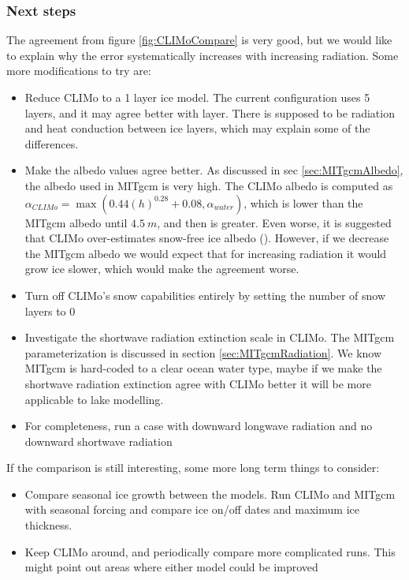 \documentclass[11pt]{article}
\begin{document}
\subsubsection{Next steps}
The agreement from figure \ref{fig:CLIMoCompare} is very good, but we would like to explain why the error systematically increases with increasing radiation. Some more modifications to try are:
\begin{itemize}
\item{Reduce CLIMo to a 1 layer ice model. The current configuration uses 5 layers, and it may agree better with  layer. There is supposed to be radiation and heat conduction between ice layers, which may explain some of the differences.}
\item{Make the albedo values agree better. As discussed in sec \ref{sec:MITgcmAlbedo}, the albedo used in MITgcm is very high. The CLIMo albedo is computed as $\alpha_{CLIMo} = \max(0.44 \left(h\right)^{0.28} + 0.08, \alpha_{water})$, which is lower than the MITgcm albedo until $\SI{4.5}{m}$, and then is greater. Even worse, it is suggested that CLIMo over-estimates snow-free ice albedo (\cite{Svacina2014}). However, if we decrease the MITgcm albedo we would expect that for increasing radiation it would grow ice slower, which would make the agreement worse.}
\item{Turn off CLIMo's snow capabilities entirely by setting the number of snow layers to 0}
\item{Investigate the shortwave radiation extinction scale in CLIMo. The MITgcm parameterization is discussed in section \ref{sec:MITgcmRadiation}. We know MITgcm is hard-coded to a clear ocean water type, maybe if we make the shortwave radiation extinction agree with CLIMo better it will be more applicable to lake modelling.}
\item{For completeness, run a case with downward longwave radiation and no downward shortwave radiation}
\end{itemize}
If the comparison is still interesting, some more long term things to consider:
\begin{itemize}
\item{Compare seasonal ice growth between the models. Run CLIMo and MITgcm with seasonal forcing and compare ice on/off dates and maximum ice thickness.}
\item{Keep CLIMo around, and periodically compare more complicated runs. This might point out areas where either model could be improved}
\end{itemize}
\end{document}

